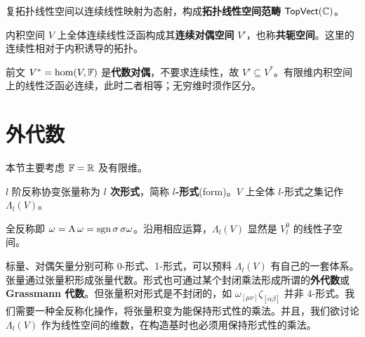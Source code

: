复拓扑线性空间以连续线性映射为态射，构成\textbf{拓扑线性空间范畴} $\mathsf{TopVect}(\mathbb{C})$。

\begin{definition}
    内积空间 $V$ 上全体连续线性泛函构成其\textbf{连续对偶空间} $V'$，也称\textbf{共轭空间}。这里的连续性相对于内积诱导的拓扑。
\end{definition}
\begin{remark}
    前文 $V^*=\hom(V,\mathbb{F})$ 是\textbf{代数对偶}，不要求连续性，故 $V'\subseteq V^*$。有限维内积空间上的线性泛函必连续，此时二者相等；无穷维时须作区分。
\end{remark}

\section{外代数}

本节主要考虑 $\mathbb{F}=\mathbb{R}$ 及有限维。

\begin{definition}
    $l$ 阶反称协变张量称为 \textbf{$l$ 次形式}，简称 \textbf{$l$-形式}(form)。$V$ 上全体 $l$-形式之集记作 $\Lambda_l(V)$。
\end{definition}
\begin{remark}
    全反称即 $\omega=\operatorname{A}\omega=\operatorname{sgn}\sigma\,\sigma\omega$。沿用相应运算，$\Lambda_l(V)$ 显然是 $V^0_l$ 的线性子空间。
\end{remark}

标量、对偶矢量分别可称 0-形式、1-形式，可以预料 $\Lambda_l(V)$ 有自己的一套体系。张量通过张量积形成张量代数。形式也可通过某个封闭乘法形成所谓的\textbf{外代数}或 \textbf{Grassmann 代数}。但张量积对形式是不封闭的，如 $\omega_{[\mu\nu]}\zeta_{[\alpha\beta]}$ 并非 4-形式。我们需要一种全反称化操作，将张量积变为能保持形式性的乘法。并且，我们欲讨论 $\Lambda_l(V)$ 作为线性空间的维数，在构造基时也必须用保持形式性的乘法。

